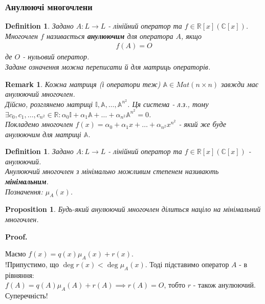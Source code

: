 \documentclass[a4paper, 10pt]{article}
\makeatletter
\theoremstyle{theoremdd}
\newtheorem{definition}[theorem]{Definition}
\newtheorem{proposition}[theorem]{Proposition}
\newtheorem{remark}[theorem]{Remark}
\renewenvironment{proof}[1][Proof.\\]{\par
\pushQED{\hfill \qed}%
\normalfont \topsep6\p@\@plus6\p@\relax
\trivlist
\item\relax
{\bfseries
#1\@addpunct{.}}\hspace\labelsep\ignorespaces
}{%
\popQED\endtrivlist\@endpefalse
}
\makeatother
\begin{document}
\iffalse
\subsubsection*{Анулюючі многочлени}
\begin{definition}
Задано $A: L \to L$ - лінійний оператор та $f \in \mathbb{R}[x] (\mathbb{C}[x])$.\\
Многочлен $f$ називається \textbf{анулюючим} для оператора $A$, якщо
\begin{align*}
f(A) = O
\end{align*}
де $O$ - нульовий оператор.\\
Задане означення можна переписати й для матриць операторів.
\end{definition}

\begin{remark}
Кожна матриця (і оператори теж) $\mathbb{A} \in Mat(n \times n)$ завжди має анулюючий многочлен.\\
Дійсно, розглянемо матриці $\mathbb{I}, \mathbb{A}, \dots, \mathbb{A}^{n^2}$. Ця система - л.з., тому\\
$\exists c_0,c_1,\dots,c_{n^2} \in \mathbb{R}: \alpha_0 \mathbb{I} + \alpha_1 \mathbb{A} + \dots + \alpha_{n^2} \mathbb{A}^{n^2} = 0$.\\
Покладемо многочлен $f(x) = \alpha_0 + \alpha_1 x + \dots + \alpha_{n^2}x^{n^2}$ - який же буде анулюючим для матриці $\mathbb{A}$.
\end{remark}

\begin{definition}
Задано $A: L \to L$ - лінійний оператор та $f \in \mathbb{R}[x] (\mathbb{C}[x])$ - анулюючий.\\
Анулюючий многочлен з мінімально можливим степенем називають \textbf{мінімальним}.\\
Позначення: $\mu_A(x)$.
\end{definition}

\begin{proposition}
Будь-який анулюючий многочлен ділиться націло на мінімальний многочлен.
\end{proposition}

\begin{proof}
Маємо $f(x) = q(x) \mu_A(x) + r(x)$.\\
!Припустимо, що $\deg r(x) < \deg \mu_A(x)$. Тоді підставимо оператор $A$ - в рівняння:\\
$f(A) = q(A) \mu_A(A) + r(A) \implies r(A) = O$, тобто $r$ - також анулюючий. Суперечність!
\end{proof}
\end{document}
